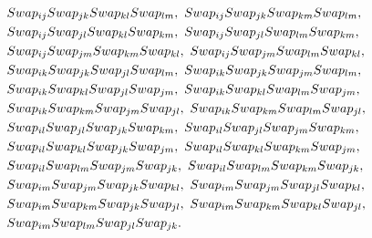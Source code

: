 \documentclass[10pt,a4paper]{amsart}
\begin{document}
\begin{equation}\label{eq: quart}
 \begin{split}
 	&\textnormal{Swap}_{ij} \textnormal{Swap}_{jk} \textnormal{Swap}_{kl} \textnormal{Swap}_{lm}, \ 
 	\textnormal{Swap}_{ij} \textnormal{Swap}_{jk} \textnormal{Swap}_{km} \textnormal{Swap}_{lm}, \ \\
 	&\textnormal{Swap}_{ij} \textnormal{Swap}_{jl} \textnormal{Swap}_{kl} \textnormal{Swap}_{km}, \ 
 	\textnormal{Swap}_{ij} \textnormal{Swap}_{jl} \textnormal{Swap}_{lm} \textnormal{Swap}_{km}, \ \\
 	&\textnormal{Swap}_{ij} \textnormal{Swap}_{jm} \textnormal{Swap}_{km} \textnormal{Swap}_{kl}, \  
 	\textnormal{Swap}_{ij} \textnormal{Swap}_{jm} \textnormal{Swap}_{lm} \textnormal{Swap}_{kl}, \ \\
 	&\textnormal{Swap}_{ik} \textnormal{Swap}_{jk} \textnormal{Swap}_{jl} \textnormal{Swap}_{lm}, \ 
 	\textnormal{Swap}_{ik} \textnormal{Swap}_{jk} \textnormal{Swap}_{jm} \textnormal{Swap}_{lm}, \ \\
 	&\textnormal{Swap}_{ik} \textnormal{Swap}_{kl} \textnormal{Swap}_{jl} \textnormal{Swap}_{jm}, \ 
 	\textnormal{Swap}_{ik} \textnormal{Swap}_{kl} \textnormal{Swap}_{lm} \textnormal{Swap}_{jm}, \ \\
 	&\textnormal{Swap}_{ik} \textnormal{Swap}_{km} \textnormal{Swap}_{jm} \textnormal{Swap}_{jl}, \ 
 	\textnormal{Swap}_{ik} \textnormal{Swap}_{km} \textnormal{Swap}_{lm} \textnormal{Swap}_{jl}, \ \\
 	&\textnormal{Swap}_{il} \textnormal{Swap}_{jl} \textnormal{Swap}_{jk} \textnormal{Swap}_{km}, \ 
 	\textnormal{Swap}_{il} \textnormal{Swap}_{jl} \textnormal{Swap}_{jm} \textnormal{Swap}_{km}, \ \\
 	&\textnormal{Swap}_{il} \textnormal{Swap}_{kl} \textnormal{Swap}_{jk} \textnormal{Swap}_{jm}, \  
 	\textnormal{Swap}_{il} \textnormal{Swap}_{kl} \textnormal{Swap}_{km} \textnormal{Swap}_{jm}, \ \\
 	&\textnormal{Swap}_{il} \textnormal{Swap}_{lm} \textnormal{Swap}_{jm} \textnormal{Swap}_{jk}, \ 
 	\textnormal{Swap}_{il} \textnormal{Swap}_{lm} \textnormal{Swap}_{km} \textnormal{Swap}_{jk}, \ \\
 	&\textnormal{Swap}_{im} \textnormal{Swap}_{jm} \textnormal{Swap}_{jk} \textnormal{Swap}_{kl}, \ 
 	\textnormal{Swap}_{im} \textnormal{Swap}_{jm} \textnormal{Swap}_{jl} \textnormal{Swap}_{kl}, \ \\
 	&\textnormal{Swap}_{im} \textnormal{Swap}_{km} \textnormal{Swap}_{jk} \textnormal{Swap}_{jl}, \
 	\textnormal{Swap}_{im} \textnormal{Swap}_{km} \textnormal{Swap}_{kl} \textnormal{Swap}_{jl}, \ \\
 	&\textnormal{Swap}_{im} \textnormal{Swap}_{lm} \textnormal{Swap}_{jl} \textnormal{Swap}_{jk}.   
 \end{split}
\end{equation}
\end{document}

